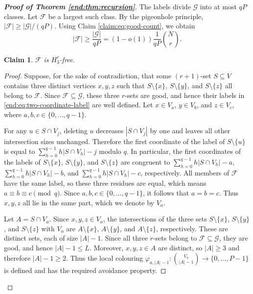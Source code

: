 \documentclass[10pt,a4paper]{amsart}
\numberwithin{equation}{section}
\newtheorem{claim}[theorem]{Claim}
\begin{document}
\begin{proof}[\bfseries{Proof of Theorem \ref{end:thm:recursion}}]
The labels divide $\mathcal G$ into at most $qP$ classes.  Let $\mathcal F$ be a largest such class.  By the pigeonhole principle,
$|\mathcal F|\ge|\mathcal G|/(qP)$.
Using Claim \ref{claim:eq:good-count}, we obtain
\begin{equation}\label{end:eq:class-size}
 |\mathcal F|\ge\frac{|\mathcal G|}{qP}
 =(1-o(1))\frac1{qP}\binom Nr.
\end{equation}


\begin{claim}\label{claim:f-is-h3r-free}
$\mathcal F$ is $H_3^r$-free.
\end{claim}
\begin{proof}
Suppose, for the sake of contradiction, that some $(r+1)$-set $S\subseteq V$ contains three distinct vertices $x,y,z$ such that
$S\setminus\{x\}$, $S\setminus\{y\}$, and $S\setminus\{z\}$ all belong to $\mathcal F$.  
Since $\mathcal F\subseteq\mathcal G$, these three $r$-sets are good, and hence their labels in \eqref{end:eq:two-coordinate-label} are well defined.  
Let $x\in V_a$, $y\in V_b$, and $z\in V_c$, where $a,b,c\in\{0,\ldots,q-1\}$.

For any $u\in S\cap V_j$, deleting $u$ decreases $|S\cap V_j|$ by one and leaves all other intersection sizes unchanged.  
Therefore the first coordinate of the label of $S\setminus\{u\}$ is equal to $\sum_{h=0}^{q-1}h|S\cap V_h|-j$ modulo $q$.
In particular, the first coordinates of the labels of $S\setminus\{x\}$, $S\setminus\{y\}$, and $S\setminus\{z\}$ are congruent to
$\sum_{h=0}^{q-1}h|S\cap V_h|-a$,
$\sum_{h=0}^{q-1}h|S\cap V_h|-b$, and
$\sum_{h=0}^{q-1}h|S\cap V_h|-c$,
respectively.  
All members of $\mathcal F$ have the same label, so these three residues are equal, which means $a\equiv b\equiv c\pmod q$.
Since $a,b,c\in\{0,\ldots,q-1\}$, it follows that $a=b=c$.  
Thus $x,y,z$ all lie in the same part, which we denote by $V_a$.

Let $A=S\cap V_a$.  Since $x,y,z\in V_a$, the intersections of the three sets $S\setminus\{x\}$, $S\setminus\{y\}$, and $S\setminus\{z\}$ with $V_a$ are
$A\setminus\{x\}$, $A\setminus\{y\}$, and $A\setminus\{z\}$,
respectively.  These are distinct sets, each of size $|A|-1$.  Since all three $r$-sets belong to $\mathcal F\subseteq\mathcal G$, they are good, and hence $|A|-1\le L$.  Moreover, $x,y,z\in A$ are distinct, so $|A|\ge3$ and therefore $|A|-1\ge2$.  Thus the local colouring
$\varphi_{a,|A|-1}:\binom{V_a}{|A|-1}\to\{0,\ldots,P-1\}$
is defined and has the required avoidance property.


\end{proof}
\end{proof}
\end{document}

